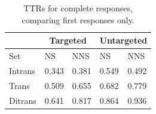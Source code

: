 \begin{table}[hb!]
\begin{center}
\begin{tabular}{|l||l|l||l|l|}
\hline
 & \multicolumn{2}{|c||}{Targeted} & \multicolumn{2}{|c|}{Untargeted} \\
\hline
 Set & NS & NNS & NS & NNS \\
\hline
\hline
Intrans & 0.343 & 0.381 & 0.549 & 0.492 \\
\hline
Trans & 0.509 & 0.655 & 0.682 & 0.779 \\ %
\hline
Ditrans & 0.641 & 0.817 & 0.864 & 0.936  \\ 
\hline
\end{tabular}
\caption{\label{tab:ttr1v1} TTRs for complete responses, comparing first responses only.}
\end{center}
\end{table}


